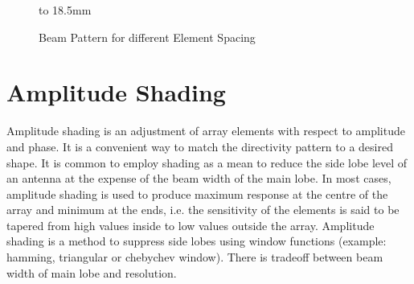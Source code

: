 \begin{figure}[h]
\centering
{}
\newline
\hbox to 18.5mm{}%
\caption{ Beam Pattern for different Element Spacing }
\end{figure}

\newpage
\section{ Amplitude Shading } \label{ Amplitude Shading } 
\noindent Amplitude shading is an adjustment of array elements with respect to amplitude and phase. It is a convenient way to match the directivity pattern to a desired shape. It is common to employ shading as a mean to reduce the side lobe level of an antenna at the expense of the beam width of the main lobe. In most cases, amplitude shading is used to produce maximum response at the centre of the array and minimum at the ends, i.e. the sensitivity of the elements is said to be tapered from high values inside to low values outside the array. Amplitude shading is a method to suppress side lobes using window functions (example: hamming, triangular or chebychev window). There is tradeoff between beam width of main lobe and resolution.


